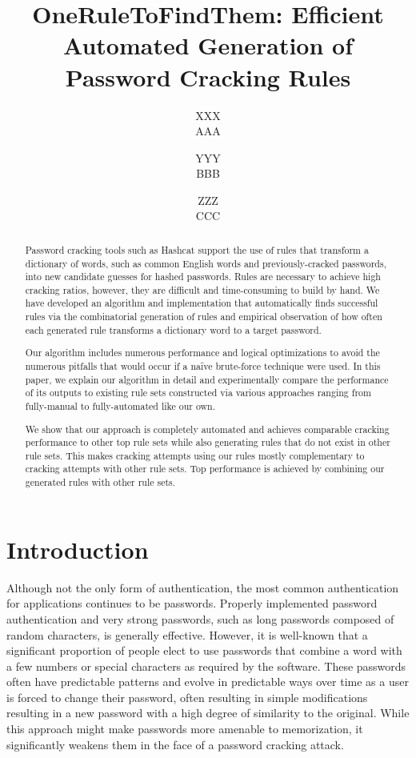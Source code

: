 \documentclass[letterpaper,twocolumn,10pt]{article}
\begin{document}
\date{}

\title{\Large \bf OneRuleToFindThem: Efficient Automated Generation of Password Cracking Rules}

\author{
{\rm XXX}\\
AAA
\and
{\rm YYY}\\
BBB
\and
{\rm ZZZ}\\
CCC
}

\maketitle

\begin{abstract}
Password cracking tools such as Hashcat support the use of rules that transform
a dictionary of words, such as common English words and previously-cracked
passwords, into new candidate guesses for hashed passwords. Rules are necessary
to achieve high cracking ratios, however, they are difficult and time-consuming
to build by hand. We have developed an algorithm and implementation that
automatically finds successful rules via the combinatorial generation of rules
and empirical observation of how often each generated rule transforms a
dictionary word to a target password.

Our algorithm includes numerous performance and logical optimizations to avoid the
numerous pitfalls that would occur if a na\"ive brute-force technique were used.
In this paper, we explain our algorithm in detail and experimentally compare the
performance of its outputs to existing rule sets constructed via various
approaches ranging from fully-manual to fully-automated like our own.

We show that our approach is completely automated and achieves comparable
cracking performance to other top rule sets while also generating rules that do
not exist in other rule sets. This makes cracking attempts using our rules
mostly complementary to cracking attempts with other rule sets. Top performance
is achieved by combining our generated rules with other rule sets.
\end{abstract}

\section{Introduction}

Although not the only form of authentication, the most common 
authentication for applications continues to be passwords. Properly implemented password
authentication and very strong passwords,
such as long passwords composed of random characters, is
generally effective. However, it is well-known that a significant proportion of
people elect to use passwords that combine a word with a few numbers or
special characters as required by the software. These passwords often
have predictable patterns and evolve in predictable ways over time as a user is
forced to change their password, often resulting in simple modifications
resulting in a new password with a high degree of similarity to the
original\cite{hanamsagar2018leveraging}. While this approach might make
passwords more amenable to memorization, it significantly weakens them in the
face of a password cracking attack.
\end{document}
